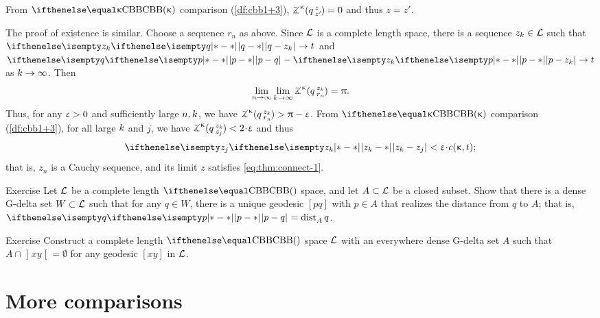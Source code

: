 From $\Alex\kappa$ comparison (\ref{df:cbb1+3}), $\angk\kappa q z {z'}=0$ and thus $z=z'$.

The proof of existence is similar.
Choose a sequence $r_n$ as above.
Since $\mathcal{L}$ is a complete length space, 
there is a sequence $z_\kay\in \spc{L}$ such that $\dist{q}{z_\kay}{}\to t$ and $\dist{p}{q}{}-\dist{p}{z_\kay}{}\to t$ as $\kay\to\infty$.
Then 
\[
\lim_{n\to\infty}
\lim_{\kay\to\infty}
\angk\kappa q{z_\kay}{r_n}
=\pi.\] 
Thus, for any $\upvarepsilon>0$ and sufficiently large $n,k$, we have $\angk\kappa q{z_\kay}{r_n}\z>\pi-\eps$.
From $\Alex\kappa$ comparison (\ref{df:cbb1+3}), for all large $k$ and $j$, we have $\angk\kappa q{z_\kay}{z_j}\z<2\cdot\eps$ and thus 
\[\dist{z_\kay}{z_j}{}<\eps\cdot\Const(\kappa,t);\]
that is, $z_n$ is a Cauchy sequence, and its limit $z$ satisfies \ref{eq:thm:connect-1}.
\qeds

\begin{thm}{Exercise}\label{ex:almost.geod}
Let $\mathcal{L}$ be a complete length $\Alex{}$ space, and let $A\subset\spc{L}$ be a closed subset.
Show that there is a dense G-delta set $W\subset\spc{L}$ such that
for any $q\in W$, there is a unique geodesic $[pq]$ with
$p\in A$ that realizes the distance from $q$ to $A$; that is, $\dist{p}{q}{}=\distfun{A}{q}{}$.
\end{thm}

\begin{thm}{Exercise}\label{ex:G-delta-not-thru}
Construct a complete length $\Alex{}$ space $\mathcal{L}$
with an everywhere dense G-delta set $A$
such that 
$A\cap \mathopen{]}xy\mathclose{[}=\emptyset$
for any geodesic $[xy]$ in $\mathcal{L}$. 
\end{thm}


\section{More comparisons}\label{sec:more-angles}

